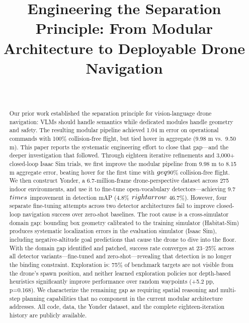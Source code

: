 \documentclass[conference]{IEEEtran}
\begin{document}
\title{Engineering the Separation Principle: From Modular Architecture to Deployable Drone Navigation}

\author{\\
}

\maketitle

\begin{abstract}
Our prior work established the separation principle for
vision-language drone navigation: VLMs should handle semantics while
dedicated modules handle geometry and safety. The resulting modular
pipeline achieved 1.04 m error on operational commands with 100\%
collision-free flight, but tied hover in aggregate (9.98 m vs.~9.50 m).
This paper reports the systematic engineering effort to close that
gap---and the deeper investigation that followed. Through eighteen
iterative refinements and 3,000+ closed-loop Isaac Sim trials, we first
improve the modular pipeline from 9.98 m to 8.15 m aggregate error,
beating hover for the first time with $\\geq$90\% collision-free flight. We
then construct Yonder, a 6.7-million-frame drone-perspective dataset
across 275 indoor environments, and use it to fine-tune open-vocabulary
detectors---achieving 9.7$\\times$ improvement in detection mAP (4.8\% $\\rightarrow$
46.7\%). However, four separate fine-tuning attempts across two detector
architectures fail to improve closed-loop navigation success over
zero-shot baselines. The root cause is a cross-simulator domain gap:
bounding box geometry calibrated to the training simulator (Habitat-Sim)
produces systematic localization errors in the evaluation simulator
(Isaac Sim), including negative-altitude goal predictions that cause the
drone to dive into the floor. With the domain gap identified and
patched, success rate converges at 23--25\% across all detector
variants---fine-tuned and zero-shot---revealing that detection is no
longer the binding constraint. Exploration is: 75\% of benchmark targets
are not visible from the drone's spawn position, and neither learned
exploration policies nor depth-based heuristics significantly improve
performance over random waypoints (+5.2 pp, p=0.168). We characterize
the remaining gap as requiring spatial reasoning and multi-step planning
capabilities that no component in the current modular architecture
addresses. All code, data, the Yonder dataset, and the complete
eighteen-iteration history are publicly available.
\end{abstract}
\end{document}
